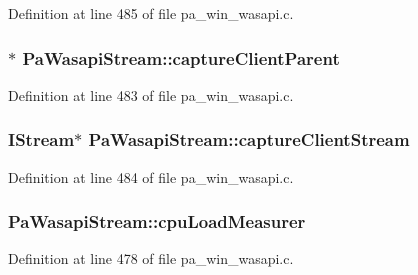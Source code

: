 Definition at line 485 of file pa\+\_\+win\+\_\+wasapi.\+c.

\subsubsection[{\texorpdfstring{capture\+Client\+Parent}{captureClientParent}}]{$\ast$ Pa\+Wasapi\+Stream\+::capture\+Client\+Parent}\hypertarget{struct_pa_wasapi_stream_a79c5cda43724aea8ff7d283a2ac66976}{}\label{struct_pa_wasapi_stream_a79c5cda43724aea8ff7d283a2ac66976}


Definition at line 483 of file pa\+\_\+win\+\_\+wasapi.\+c.

\subsubsection[{\texorpdfstring{capture\+Client\+Stream}{captureClientStream}}]{\setlength{\rightskip}{0pt plus 5cm}I\+Stream$\ast$ Pa\+Wasapi\+Stream\+::capture\+Client\+Stream}\hypertarget{struct_pa_wasapi_stream_a315d06c7f23d23f05f90579a80d0530d}{}\label{struct_pa_wasapi_stream_a315d06c7f23d23f05f90579a80d0530d}


Definition at line 484 of file pa\+\_\+win\+\_\+wasapi.\+c.

\subsubsection[{\texorpdfstring{cpu\+Load\+Measurer}{cpuLoadMeasurer}}]{ Pa\+Wasapi\+Stream\+::cpu\+Load\+Measurer}\hypertarget{struct_pa_wasapi_stream_aec37a2f4bcafd3f1a595a46e5393bd64}{}\label{struct_pa_wasapi_stream_aec37a2f4bcafd3f1a595a46e5393bd64}


Definition at line 478 of file pa\+\_\+win\+\_\+wasapi.\+c.

